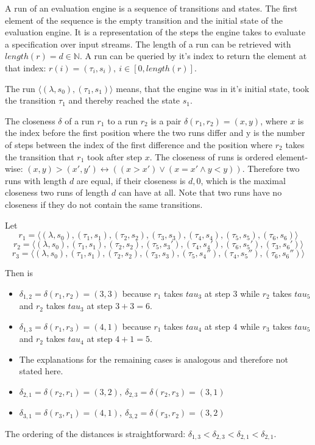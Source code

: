 A run of an evaluation engine is a sequence of transitions and states.
The first element of the sequence is the empty transition and the initial state of the evaluation engine.
It is a representation of the steps the engine takes to evaluate a specification over input streams.
The length of a run can be retrieved with \(\mathit{length}(r) = d \in \mathbb{N}\).
A run can be queried by it's index to return the element at that index: \(r(i)=(\tau_i, s_i),\ i \in [0, \mathit{length}(r)]\).

The run \(\langle (\lambda, s_0), (\tau_1, s_1) \rangle\) means, that the engine was in it's initial state, took the transition \(\tau_1\) and thereby reached the state \(s_1\).

\begin{definition}[name = Closeness of Runs]\label{def:runs_closeness}
  The closeness \(\delta\) of a run \(r_1\) to a run \(r_2\) is a pair \(\delta(r_1,r_2) = (x,y)\), where \(x\) is the index before the first position where the two runs differ and y is the number of steps between the index of the first difference and the position where \(r_2\) takes the transition that \(r_1\) took after step \(x\).
  The closeness of runs is ordered element-wise: \((x,y) > (x',y') \leftrightarrow ((x > x') \lor (x = x' \land y < y))\).
  Therefore two runs with length \(d\) are equal, if their closeness is \(d,0\), which is the maximal closeness two runs of length \(d\) can have at all.
  Note that two runs have no closeness if they do not contain the same transitions.
\end{definition}

\begin{exmp}[name = Closeness of Runs]
  Let
  \[r_1 = \langle (\lambda, s_0), (\tau_1,s_1), (\tau_2,s_2), (\tau_3,s_3), (\tau_4,s_4), (\tau_5,s_5), (\tau_6,s_6) \rangle\]
  \[r_2 = \langle (\lambda, s_0), (\tau_1,s_1), (\tau_2,s_2), (\tau_5,s_3'), (\tau_4,s_4'), (\tau_6,s_5'), (\tau_3,s_6') \rangle\]
  \[r_3 = \langle (\lambda, s_0), (\tau_1,s_1), (\tau_2,s_2), (\tau_3,s_3), (\tau_5,s_4''), (\tau_4,s_5''), (\tau_6,s_6'') \rangle\]

  Then is
  \begin{itemize}
    \item \(\delta_{1,2} = \delta(r_1,r_2) = (3,3)\) because \(r_1\) takes \(tau_3\) at step \(3\) while \(r_2\) takes \(tau_5\) and \(r_2\) takes \(tau_3\) at step \(3 + 3 = 6\).
    \item \(\delta_{1,3} = \delta(r_1,r_3) = (4,1)\) because \(r_1\) takes \(tau_4\) at step \(4\) while \(r_3\) takes \(tau_5\) and \(r_2\) takes \(tau_4\) at step \(4 + 1 = 5\).
    \item The explanations for the remaining cases is analogous and therefore not stated here.
    \item \(\delta_{2,1} = \delta(r_2,r_1) = (3,2),\ \delta_{2,3} = \delta(r_2,r_3) = (3,1)\)
    \item \(\delta_{3,1} = \delta(r_3,r_1) = (4,1),\ \delta_{3,2} = \delta(r_3,r_2) = (3,2)\)
  \end{itemize}
  The ordering of the distances is straightforward: \(\delta_{1,3} < \delta_{2,3} < \delta_{2,1} < \delta_{2,1}\).
\end{exmp}

